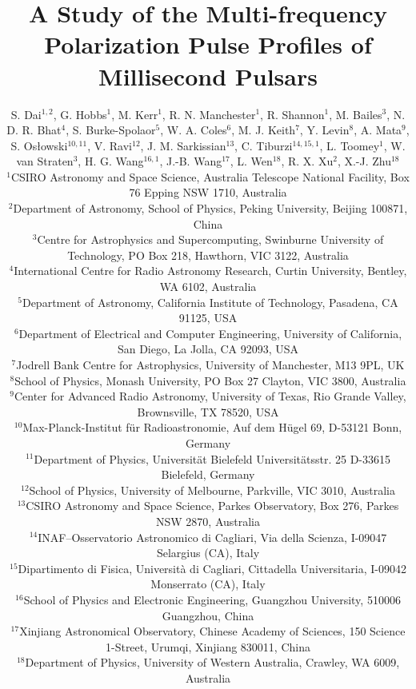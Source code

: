 \documentclass[useAMS,usenatbib]{mn2e}
\begin{document}
\title[A Study of the Multi-frequency Polarization Pulse Profiles of Millisecond Pulsars]{A Study of the Multi-frequency Polarization Pulse Profiles of Millisecond Pulsars}
\author[S. Dai et al.]{S. Dai$^{1,2}$, G. Hobbs$^1$, M. Kerr$^1$, R. N. Manchester$^1$, R. Shannon$^1$, M. Bailes$^3$,  
\newauthor N. D. R. Bhat$^4$, S. Burke-Spolaor$^5$, W. A. Coles$^6$, M. J. Keith$^7$, Y. Levin$^8$, A. Mata$^9$,
\newauthor S. Os\l owski$^{10,11}$, V. Ravi$^{12}$, J. M. Sarkissian$^{13}$, C. Tiburzi$^{14,15,1}$, L. Toomey$^{1}$, 
\newauthor W. van Straten$^3$, H. G. Wang$^{16,1}$, J.-B. Wang$^{17}$, L. Wen$^{18}$, R. X. Xu$^2$, X.-J. Zhu$^{18}$\\
$^1$CSIRO Astronomy and Space Science, Australia Telescope National Facility, Box 76 Epping NSW 1710, Australia\\
$^2$Department of Astronomy, School of Physics, Peking University, Beijing 100871, China\\
$^3$Centre for Astrophysics and Supercomputing, Swinburne University of Technology, PO Box 218, Hawthorn, VIC 3122, Australia\\
$^4$International Centre for Radio Astronomy Research, Curtin University, Bentley, WA 6102, Australia\\
$^5$Department of Astronomy, California Institute of Technology, Pasadena, CA 91125, USA\\
$^6$Department of Electrical and Computer Engineering, University of California, San Diego, La Jolla, CA 92093, USA\\
$^7$Jodrell Bank Centre for Astrophysics, University of Manchester, M13 9PL, UK\\
$^8$School of Physics, Monash University, PO Box 27 Clayton, VIC 3800, Australia\\
$^9$Center for Advanced Radio Astronomy, University of Texas, Rio Grande Valley, Brownsville, TX 78520, USA\\
$^{10}$Max-Planck-Institut f\"{u}r Radioastronomie, Auf dem H\"{u}gel 69, D-53121 Bonn, Germany\\
$^{11}$Department of Physics, Universit\"{a}t Bielefeld Universit\"{a}tsstr. 25 D-33615 Bielefeld, Germany\\
$^{12}$School of Physics, University of Melbourne, Parkville, VIC 3010, Australia\\
$^{13}$CSIRO Astronomy and Space Science, Parkes Observatory, Box 276, Parkes NSW 2870, Australia\\
$^{14}$INAF–Osservatorio Astronomico di Cagliari, Via della Scienza, I-09047 Selargius (CA), Italy\\
$^{15}$Dipartimento di Fisica, Universit\`a di Cagliari, Cittadella Universitaria, I-09042 Monserrato (CA), Italy\\
$^{16}$School of Physics and Electronic Engineering, Guangzhou University, 510006 Guangzhou, China\\
$^{17}$Xinjiang Astronomical Observatory, Chinese Academy of Sciences, 150 Science 1-Street, Urumqi, Xinjiang 830011, China\\
$^{18}$Department of Physics, University of Western Australia, Crawley, WA 6009, Australia\\
}
\end{document}
